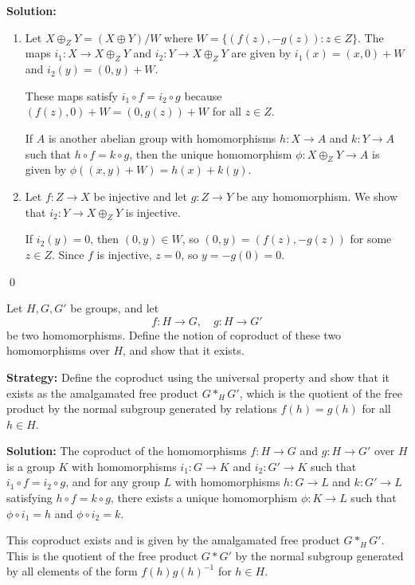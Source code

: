 \noindent\textbf{Solution:}
\begin{enumerate}[label=(\alph*)]
\item Let $X \oplus_Z Y = (X \oplus Y)/W$ where $W = \{(f(z), -g(z)) : z \in Z\}$. The maps $i_1: X \to X \oplus_Z Y$ and $i_2: Y \to X \oplus_Z Y$ are given by $i_1(x) = (x, 0) + W$ and $i_2(y) = (0, y) + W$.

These maps satisfy $i_1 \circ f = i_2 \circ g$ because $(f(z), 0) + W = (0, g(z)) + W$ for all $z \in Z$.

If $A$ is another abelian group with homomorphisms $h: X \to A$ and $k: Y \to A$ such that $h \circ f = k \circ g$, then the unique homomorphism $\phi: X \oplus_Z Y \to A$ is given by $\phi((x, y) + W) = h(x) + k(y)$.

\item Let $f: Z \to X$ be injective and let $g: Z \to Y$ be any homomorphism. We show that $i_2: Y \to X \oplus_Z Y$ is injective.

If $i_2(y) = 0$, then $(0, y) \in W$, so $(0, y) = (f(z), -g(z))$ for some $z \in Z$. Since $f$ is injective, $z = 0$, so $y = -g(0) = 0$.
\end{enumerate}


\qed
\begin{problembox}
Let $H, G, G'$ be groups, and let
\[f: H \rightarrow G, \quad g: H \rightarrow G'\]
be two homomorphisms. Define the notion of coproduct of these two homomorphisms over $H$, and show that it exists.
\end{problembox}

\noindent\textbf{Strategy:} Define the coproduct using the universal property and show that it exists as the amalgamated free product $G *_H G'$, which is the quotient of the free product by the normal subgroup generated by relations $f(h) = g(h)$ for all $h \in H$.

\noindent\textbf{Solution:} The coproduct of the homomorphisms $f: H \to G$ and $g: H \to G'$ over $H$ is a group $K$ with homomorphisms $i_1: G \to K$ and $i_2: G' \to K$ such that $i_1 \circ f = i_2 \circ g$, and for any group $L$ with homomorphisms $h: G \to L$ and $k: G' \to L$ satisfying $h \circ f = k \circ g$, there exists a unique homomorphism $\phi: K \to L$ such that $\phi \circ i_1 = h$ and $\phi \circ i_2 = k$.

This coproduct exists and is given by the amalgamated free product $G *_H G'$. This is the quotient of the free product $G * G'$ by the normal subgroup generated by all elements of the form $f(h)g(h)^{-1}$ for $h \in H$.

